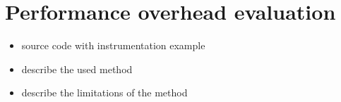 \documentclass[10pt,twoside,english]{_support/latex/sbabook/sbabook}
\begin{document}
\section{Performance overhead evaluation}
\begin{itemize}
\item source code with instrumentation example
\item describe the used method
\item describe the limitations of the method
\end{itemize}






\backmatter

\end{document}
